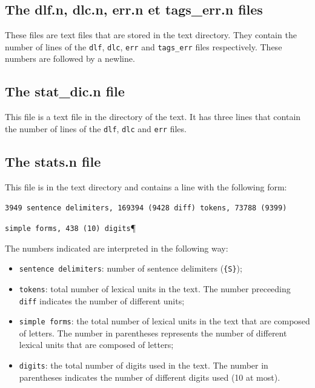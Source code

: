 \subsection{The dlf.n, dlc.n, err.n et tags\_err.n files}
These files are text files that are stored in the text directory. They
contain the number of lines of the \verb+dlf+, \verb+dlc+, \verb+err+ and \verb+tags_err+ files
respectively. These numbers are followed by a newline.


\subsection{The stat\_dic.n file}
This file is a text file in the directory of the text. It has three lines that
contain the number of lines of the \verb+dlf+, \verb+dlc+ and \verb+err+ files.

\subsection{The stats.n file}
This file is in the text directory and contains a line with the following form:


\bigskip
\verb$3949 sentence delimiters, 169394 (9428 diff) tokens, 73788 (9399)$

\verb$simple forms, 438 (10) digits$\P

\bigskip
\noindent The numbers indicated are interpreted in the following way:
\begin{itemize}
  \item \verb+sentence delimiters+: number of sentence delimiters
  (\verb+{S}+);

  \item \verb+tokens+: total number of lexical units in the text. The number
  preceeding \verb+diff+ indicates the number of different units;

  \item \verb+simple forms+: the total number of lexical units in the text that
  are composed of letters. The number in parentheses represents the number of
  different lexical units that are composed of letters;

  \item \verb+digits+: the total number of digits used in the text. The number in
  parentheses indicates the number of different digits used (10 at most).

\end{itemize}


